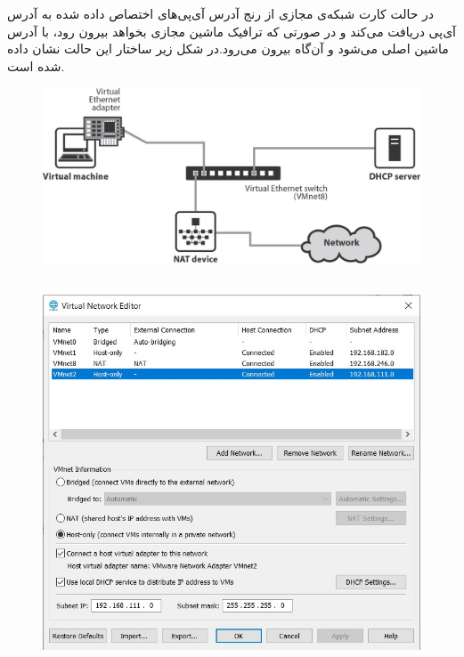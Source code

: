 \documentclass{article}
\begin{document}
در حالت  کارت شبکه‌ی مجازی از رنج آدرس آی‌پی‌های اختصاص داده شده به  آدرس آی‌پی دریافت می‌کند و در صورتی که ترافیک ماشین مجازی بخواهد بیرون رود، با آدرس ماشین اصلی  می‌شود و آن‌گاه بیرون می‌رود.در شکل زیر ساختار این حالت نشان داده شده است.
\begin{figure}[H]
    \centering
    \includegraphics[width=1.0\textwidth]{figures/7c.jpg}
    \caption
	{
	}
    \label{fig:fig1}
\end{figure}

\subsection{}
\begin{figure}[H]
    \centering
    \includegraphics[width=1.0\textwidth]{figures/8a.jpg}
    \caption
	{
	}
    \label{fig:fig1}
\end{figure}
\end{document}
